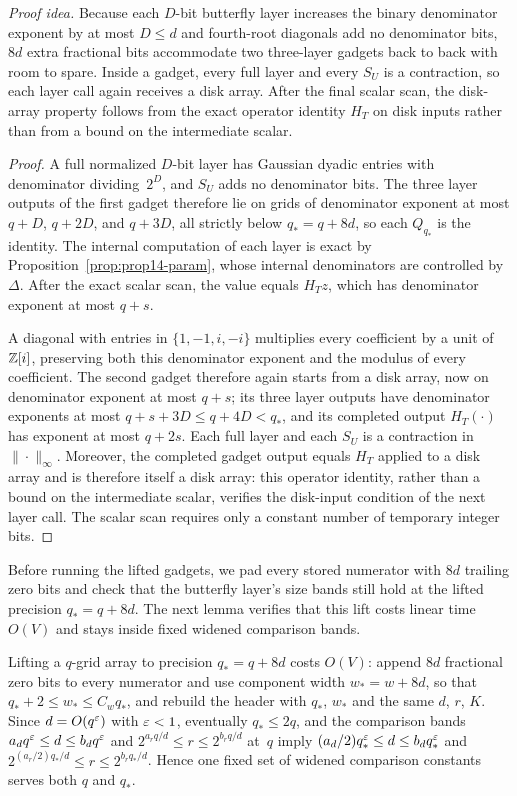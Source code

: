 \emph{Proof idea.} Because each $D$-bit butterfly layer increases the binary denominator exponent by at most $D\le d$
and fourth-root diagonals add no denominator bits, $8d$ extra fractional bits accommodate two three-layer gadgets back
to back with room to spare. Inside a gadget, every full layer and every $S_U$ is a contraction, so each layer call again
receives a disk array. After the final scalar scan, the disk-array property follows from the exact operator identity
$H_T$ on disk inputs rather than from a bound on the intermediate scalar.

\begin{proof}
A full normalized $D$-bit layer has Gaussian dyadic entries with denominator dividing~$2^D$, and $S_U$ adds no
denominator bits. The three layer outputs of the first gadget therefore lie on grids of denominator exponent at most
$q+D$, $q+2D$, and $q+3D$, all strictly below $q_*=q+8d$, so each $Q_{q_*}$ is the identity. The internal computation of
each layer is exact by Proposition~\ref{prop:prop14-param}, whose internal denominators are controlled by~$\Delta$.
After the exact scalar scan, the value equals $H_Tz$, which has denominator exponent at most $q+s$.

A diagonal with entries in $\{1,-1,i,-i\}$ multiplies every coefficient by a unit of $\mathbb{Z}[i]$, preserving both this
denominator exponent and the modulus of every coefficient. The second gadget therefore again starts from a disk array,
now on denominator exponent at most $q+s$; its three layer outputs have denominator exponents at most $q+s+3D\le q+4D<q_*$,
and its completed output $H_T(\cdot)$ has exponent at most $q+2s$. Each full layer and each $S_U$ is a contraction in
$\|\cdot\|_\infty$. Moreover, the completed gadget output equals $H_T$ applied to a disk array and is therefore itself a
disk array: this operator identity, rather than a bound on the intermediate scalar, verifies the disk-input condition of
the next layer call. The scalar scan requires only a constant number of temporary integer bits.
\end{proof}

Before running the lifted gadgets, we pad every stored numerator with $8d$ trailing zero bits and check that the
butterfly layer's size bands still hold at the lifted precision $q_*=q+8d$. The next lemma verifies that this lift costs
linear time $O(V)$ and stays inside fixed widened comparison bands.

\begin{lemma}[Lifting]\label{lem:walsh-lift}
Lifting a $q$-grid array to precision $q_*=q+8d$ costs $O(V)$: append $8d$ fractional zero bits to every numerator and
use component width $w_*=w+8d$, so that $q_*+2\le w_*\le C_wq_*$, and rebuild the header with $q_*$, $w_*$ and the same
$d$, $r$, $K$. Since $d=O(q^\varepsilon)$ with $\varepsilon<1$, eventually $q_*\le2q$, and the comparison bands
$a_dq^\varepsilon\le d\le b_dq^\varepsilon$ and $2^{a_rq/d}\le r\le 2^{b_rq/d}$ at~$q$ imply
$(a_d/2)q_*^\varepsilon\le d\le b_dq_*^\varepsilon$ and $2^{(a_r/2)q_*/d}\le r\le2^{b_rq_*/d}$. Hence one fixed set of widened
comparison constants serves both $q$ and $q_*$.
\end{lemma}

